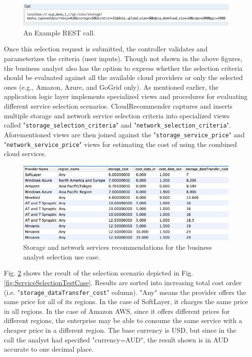 \begin{figure}[!ht]
  \includegraphics[width=\textwidth,keepaspectratio]{Figures/system/CloudRecommender/GET.jpg}
  \caption{An Example REST call.}
  \label{fig:ExampleRESTcallGET}
\end{figure}

Once this selection request is submitted, the controller validates and parameterizes the
criteria (user inputs). Though not shown in the above figures, the business analyst also has the
option to express whether the selection criteria should be evaluated against all the
available cloud providers or only the selected ones (e.g., Amazon, Azure, and GoGrid
only). As mentioned earlier, the application logic layer implements specialized views
and procedures for evaluating different service selection scenarios.
CloudRecommender captures and inserts multiple storage and network service
selection criteria into specialized views called "\texttt{storage\_selection\_criteria}" and
"\texttt{network\_selection\_criteria}". Aforementioned views are then joined against the
"\texttt{storage\_service\_price}" and "\texttt{network\_service\_price}" views for estimating the cost of
using the combined cloud services.

\begin{figure}[!ht]
  \includegraphics[width=\textwidth,keepaspectratio]{Figures/system/CloudRecommender/recommendationResults.jpg}
  \caption{Storage and network services recommendations for the business analyst selection use case.}
  \label{fig:StorageNetworkServicesRecommendations}
\end{figure}

Fig. \ref{fig:StorageNetworkServicesRecommendations} shows the result of the
selection scenario depicted in Fig. \ref{fig:ServiceSelectionTestCase}.
Results are sorted into increasing total cost order (i.e. "\texttt{storage\_dataTransfer\_cost}"
column). "Any" means the provider offers the same price for all of its regions. In the
case of SoftLayer, it charges the same price in all regions. In the case of Amazon
AWS, since it offers different prices for different regions, the enterprise may be able
to consume the same service with a cheaper price in a different region. The base
currency is USD, but since in the call the analyst had specified "currency=AUD", the
result shown is in AUD accurate to one decimal place.

